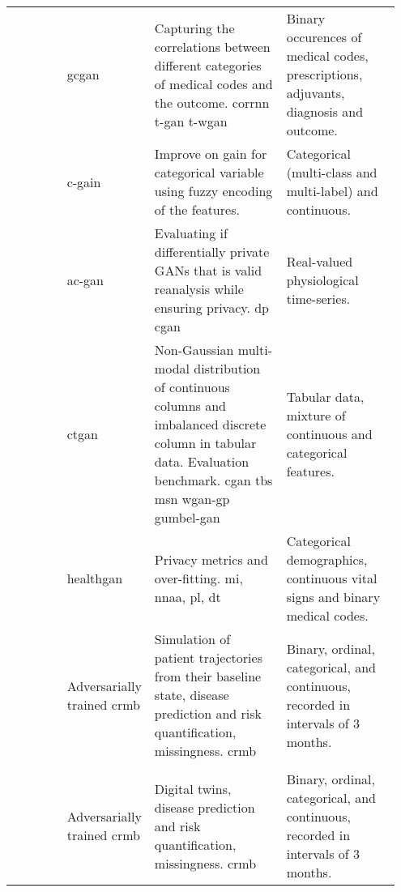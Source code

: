 \begin{landscape}
\begin{longtable}[l]{@{}p{0.15\linewidth}p{0.15\linewidth}p{0.35\linewidth}p{0.3\linewidth}@{}}
        \citeauthor{Yang_2019_ehr} & \gls{gcgan}
        & Capturing the correlations between different categories of medical codes and the outcome. \gls{corrnn} \gls{t-gan} \gls{t-wgan}
        & Binary occurences of medical codes, prescriptions, adjuvants, diagnosis and outcome.\\
        
        \citeauthor{Yang_2019_impute_ehr} & \gls{c-gain}
        & Improve on \gls{gain} for categorical variable using fuzzy encoding of the features. 
        & Categorical (multi-class and multi-label) and continuous.\\
        
        \citeauthor{Beaulieu-Jones2019-ct} & \gls{ac-gan} 
        & Evaluating if differentially private GANs that is valid reanalysis while ensuring privacy. \gls{dp} \gls{cgan}
        & Real-valued physiological time-series.\\
        
        \citeauthor{Xu2019-ay} & \gls{ctgan}
        & Non-Gaussian multi-modal distribution of continuous columns and imbalanced discrete column in tabular data. Evaluation benchmark. \gls{cgan} \gls{tbs} \gls{msn} \gls{wgan-gp} \gls{gumbel-gan}
        & Tabular data, mixture of continuous and categorical features.\\
        
        \citeauthor{yale2019ESANN} & \gls{healthgan}
        & Privacy metrics and over-fitting. \gls{mi}, \gls{nnaa}, \gls{pl}, \gls{dt}
        & Categorical demographics, continuous vital signs and binary medical codes.\\
        
        \citeauthor{Fisher2019} & Adversarially trained \gls{crmb}
        & Simulation of patient trajectories from their baseline state, disease prediction and risk quantification, missingness. \gls{crmb}
        &  Binary, ordinal, categorical, and continuous, recorded in intervals of 3 months.\\
        
        \hline
        \quad 2020 & & & \\
        \hline
        
        \citeauthor{walsh2020generating} & Adversarially trained \gls{crmb}
        & Digital twins, disease prediction and risk quantification, missingness. \gls{crmb}
        &  Binary, ordinal, categorical, and continuous, recorded in intervals of 3 months.\\
        

\end{longtable}
\end{landscape}
